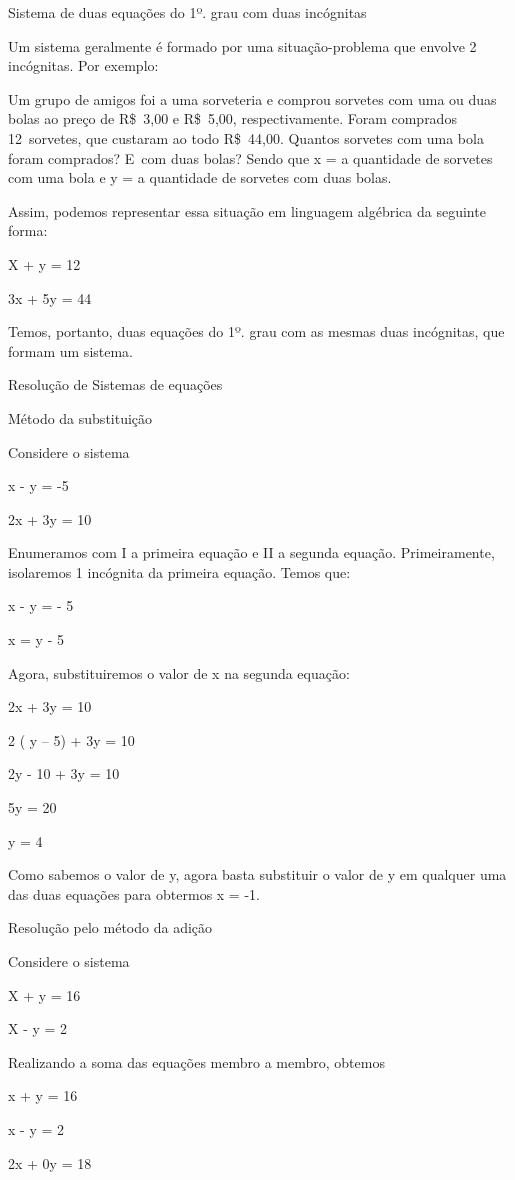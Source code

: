Sistema de duas equações do 1º. grau com duas incógnitas

Um sistema geralmente é formado por uma situação-problema que envolve 2
incógnitas. Por exemplo:

Um grupo de amigos foi a uma sorveteria e comprou sorvetes com uma ou
duas bolas ao preço de R\$~3,00 e R\$~5,00, respectivamente. Foram
comprados 12~sorvetes, que custaram ao todo R\$~44,00. Quantos sorvetes
com uma bola foram comprados? E~com duas bolas? Sendo que x = a
quantidade de sorvetes com uma bola e y = a quantidade de sorvetes com
duas bolas.

Assim, podemos representar essa situação em linguagem algébrica da
seguinte forma:

X + y = 12

3x + 5y = 44

Temos, portanto, duas equações do 1º. grau com as mesmas duas
incógnitas, que formam um sistema.

Resolução de Sistemas de equações

Método da substituição

Considere o sistema

x - y = -5

2x + 3y = 10

Enumeramos com I a primeira equação e II a segunda equação.
Primeiramente, isolaremos 1 incógnita da primeira equação. Temos que:

x - y = - 5

x = y - 5

Agora, substituiremos o valor de x na segunda equação:

2x + 3y = 10

2 ( y -- 5) + 3y = 10

2y - 10 + 3y = 10

5y = 20

y = 4

Como sabemos o valor de y, agora basta substituir o valor de y em
qualquer uma das duas equações para obtermos x = -1.

Resolução pelo método da adição

Considere o sistema

X + y = 16

X - y = 2

Realizando a soma das equações membro a membro, obtemos

x + y = 16

x - y = 2

2x + 0y = 18

